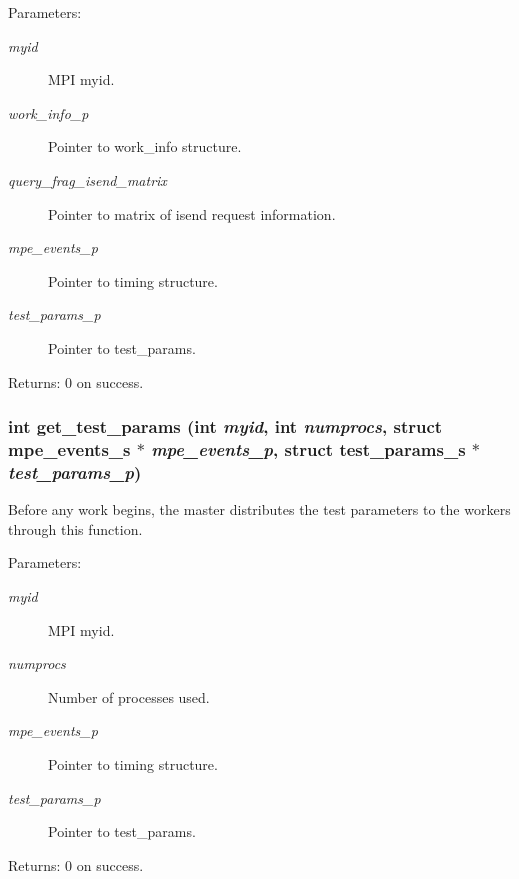 \begin{Desc}
\item[Parameters:]
\begin{description}
\item[{\em myid}]MPI myid. \item[{\em work\_\-info\_\-p}]Pointer to work\_\-info structure. \item[{\em query\_\-frag\_\-isend\_\-matrix}]Pointer to matrix of isend request information. \item[{\em mpe\_\-events\_\-p}]Pointer to timing structure. \item[{\em test\_\-params\_\-p}]Pointer to test\_\-params. \end{description}
\end{Desc}
\begin{Desc}
\item[Returns:]0 on success. \end{Desc}
\subsubsection{\setlength{\rightskip}{0pt plus 5cm}int get\_\-test\_\-params (int {\em myid}, int {\em numprocs}, struct \bf{mpe\_\-events\_\-s} $\ast$ {\em mpe\_\-events\_\-p}, struct \bf{test\_\-params\_\-s} $\ast$ {\em test\_\-params\_\-p})}\label{worker__help_8h_161c6bf11404da23f92bd2ff27821b34}


Before any work begins, the master distributes the test parameters to the workers through this function.

\begin{Desc}
\item[Parameters:]
\begin{description}
\item[{\em myid}]MPI myid. \item[{\em numprocs}]Number of processes used. \item[{\em mpe\_\-events\_\-p}]Pointer to timing structure. \item[{\em test\_\-params\_\-p}]Pointer to test\_\-params. \end{description}
\end{Desc}
\begin{Desc}
\item[Returns:]0 on success. \end{Desc}
